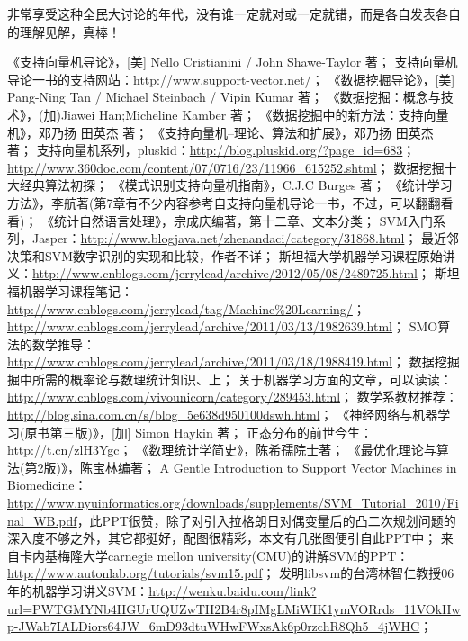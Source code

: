\documentclass[a4paper,12pt]{article}
\begin{document}
非常享受这种全民大讨论的年代，没有谁一定就对或一定就错，而是各自发表各自的理解见解，真棒！
\begin{thebibliography}{11}
\bibitem{}  《支持向量机导论》，[美] Nello Cristianini / John Shawe-Taylor 著；
\bibitem{}  支持向量机导论一书的支持网站：\url{http://www.support-vector.net/}；
\bibitem{}  《数据挖掘导论》，[美] Pang-Ning Tan / Michael Steinbach / Vipin Kumar 著；
\bibitem{} 《数据挖掘：概念与技术》，(加)Jiawei Han;Micheline Kamber 著；
\bibitem{}  《数据挖掘中的新方法：支持向量机》，邓乃扬 田英杰 著；
\bibitem{}  《支持向量机--理论、算法和扩展》，邓乃扬 田英杰 著；
\bibitem{}  支持向量机系列，pluskid：\url{http://blog.pluskid.org/?page_id=683}；
\bibitem{}  \url{http://www.360doc.com/content/07/0716/23/11966_615252.shtml}；
\bibitem{}  数据挖掘十大经典算法初探；
\bibitem{}  《模式识别支持向量机指南》，C.J.C Burges 著；
\bibitem{}  《统计学习方法》，李航著(第7章有不少内容参考自支持向量机导论一书，不过，可以翻翻看看)；
\bibitem{}  《统计自然语言处理》，宗成庆编著，第十二章、文本分类；
\bibitem{}  SVM入门系列，Jasper：\url{http://www.blogjava.net/zhenandaci/category/31868.html}；
\bibitem{}  最近邻决策和SVM数字识别的实现和比较，作者不详；
\bibitem{}  斯坦福大学机器学习课程原始讲义：\url{http://www.cnblogs.com/jerrylead/archive/2012/05/08/2489725.html}；
\bibitem{}  斯坦福机器学习课程笔记：\url{http://www.cnblogs.com/jerrylead/tag/Machine%20Learning/}；
\bibitem{}  \url{http://www.cnblogs.com/jerrylead/archive/2011/03/13/1982639.html}；
\bibitem{}  SMO算法的数学推导：\url{http://www.cnblogs.com/jerrylead/archive/2011/03/18/1988419.html}；
\bibitem{}  数据挖掘掘中所需的概率论与数理统计知识、上；
\bibitem{}  关于机器学习方面的文章，可以读读：\url{http://www.cnblogs.com/vivounicorn/category/289453.html}；
\bibitem{}  数学系教材推荐：\url{http://blog.sina.com.cn/s/blog_5e638d950100dswh.html}；
\bibitem{}  《神经网络与机器学习(原书第三版)》，[加] Simon Haykin 著；
\bibitem{}  正态分布的前世今生：\url{http://t.cn/zlH3Ygc}；
\bibitem{}  《数理统计学简史》，陈希孺院士著；
\bibitem{}  《最优化理论与算法(第2版)》，陈宝林编著；
\bibitem{}  A Gentle Introduction to Support Vector Machines in Biomedicine：\url{http://www.nyuinformatics.org/downloads/supplements/SVM_Tutorial_2010/Final_WB.pdf}，此PPT很赞，除了对引入拉格朗日对偶变量后的凸二次规划问题的深入度不够之外，其它都挺好，配图很精彩，本文有几张图便引自此PPT中；
\bibitem{}  来自卡内基梅隆大学carnegie mellon university(CMU)的讲解SVM的PPT：\url{http://www.autonlab.org/tutorials/svm15.pdf}；
\bibitem{}  发明libsvm的台湾林智仁教授06年的机器学习讲义SVM：\url{http://wenku.baidu.com/link?url=PWTGMYNb4HGUrUQUZwTH2B4r8pIMgLMiWIK1ymVORrds_11VOkHwp-JWab7IALDiors64JW_6mD93dtuWHwFWxsAk6p0rzchR8Qh5_4jWHC}；

\end{thebibliography}
\end{document}
